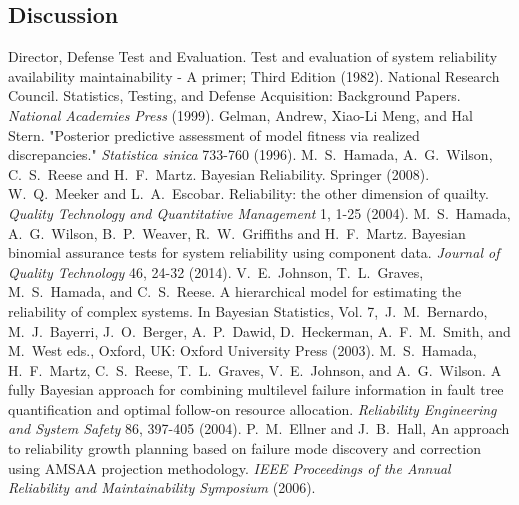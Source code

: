 \documentclass[12pt]{article}
\begin{document}
\subsection{Discussion}

\begin{thebibliography}{99}
 Director, Defense Test and Evaluation. Test and evaluation of
system reliability availability maintainability - A primer; Third Edition
(1982).
 National Research Council. Statistics, Testing, and Defense
Acquisition: Background Papers. \textit{National Academies Press} (1999).
 Gelman, Andrew, Xiao-Li Meng, and Hal Stern. "Posterior
predictive assessment of model fitness via realized discrepancies."
\textit{Statistica sinica} 733-760 (1996).
 M.\ S.\ Hamada, A.\ G.\ Wilson, C.\ S.\ Reese and H.\ F.\ Martz.
Bayesian Reliability. Springer (2008).
 W.\ Q.\ Meeker and L.\ A.\
Escobar. Reliability: the other dimension of quailty. \textit{Quality Technology
and Quantitative Management} 1, 1-25 (2004). \bibitem{HWWGM13} M.\ S.\ Hamada,
A.\ G.\ Wilson, B.\ P.\ Weaver, R.\ W.\ Griffiths and H.\ F.\ Martz. Bayesian
binomial assurance tests for system reliability using component data.
\textit{Journal of Quality Technology} 46, 24-32 (2014).  V.\
E.\ Johnson, T.\ L.\ Graves, M.\ S.\ Hamada, and C.\ S.\ Reese. A hierarchical
model for estimating the reliability of complex systems. In Bayesian Statistics,
Vol. 7,\ J.\ M.\ Bernardo, M.\ J.\ Bayerri, J.\ O.\ Berger, A.\ P.\ Dawid, D.\
Heckerman, A.\ F.\ M.\ Smith, and M.\ West eds., Oxford, UK: Oxford University
Press (2003). \bibitem{HMRGJW04} M.\ S.\ Hamada, H.\ F.\ Martz, C.\ S.\ Reese,
T.\ L.\ Graves, V.\ E.\ Johnson, and A.\ G.\ Wilson. A fully Bayesian approach
for combining multilevel failure information in fault tree quantification and
optimal follow-on resource allocation. \textit{Reliability Engineering and
System Safety} 86, 397-405 (2004). \bibitem{EH06} P.\ M.\ Ellner and J.\ B.\
Hall, An approach to reliability growth planning based on failure mode discovery
and correction using AMSAA projection methodology. \textit{IEEE Proceedings of
the Annual Reliability and Maintainability Symposium} (2006).
\end{thebibliography}
\end{document}
